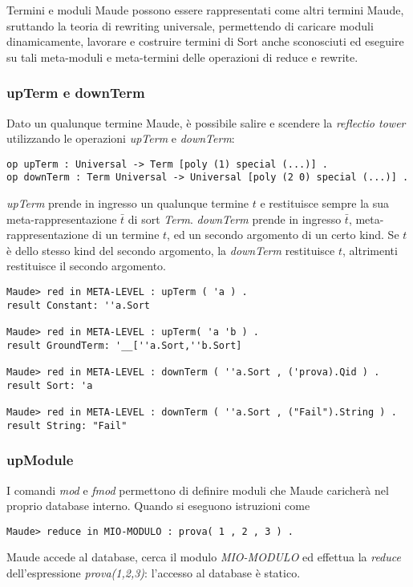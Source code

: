 Termini e moduli Maude possono essere rappresentati come altri termini Maude,
sruttando la teoria di rewriting universale, permettendo di caricare moduli
dinamicamente, lavorare e costruire termini di Sort anche sconosciuti ed
eseguire su tali meta-moduli e meta-termini delle operazioni di reduce e rewrite.

\subsubsection{upTerm e downTerm}

Dato un qualunque termine Maude, è possibile salire e scendere la
\emph{reflectio tower} utilizzando le operazioni \emph{upTerm} e
\emph{downTerm}:
\begin{Verbatim}[fontsize=\small]
op upTerm : Universal -> Term [poly (1) special (...)] .
op downTerm : Term Universal -> Universal [poly (2 0) special (...)] .
\end{Verbatim}
\emph{upTerm} prende in ingresso un qualunque termine $t$ e restituisce sempre
la sua meta-rappresentazione $\bar{t}$ di sort \emph{Term}. \emph{downTerm}
prende in ingresso $\bar{t}$, meta-rappresentazione di un termine $t$, ed un secondo argomento di
un certo kind. Se $t$ è dello stesso kind del secondo argomento, la
\emph{downTerm} restituisce $t$, altrimenti restituisce il secondo argomento.
\begin{Verbatim}[fontsize=\small]
Maude> red in META-LEVEL : upTerm ( 'a ) .
result Constant: ''a.Sort

Maude> red in META-LEVEL : upTerm( 'a 'b ) .
result GroundTerm: '__[''a.Sort,''b.Sort]

Maude> red in META-LEVEL : downTerm ( ''a.Sort , ('prova).Qid ) .
result Sort: 'a

Maude> red in META-LEVEL : downTerm ( ''a.Sort , ("Fail").String ) .
result String: "Fail"
\end{Verbatim}

\subsubsection{upModule}
\label{sec:upMod}
I comandi \emph{mod} e \emph{fmod} permettono di definire moduli che Maude
caricherà nel proprio database interno. Quando si eseguono istruzioni come
\begin{Verbatim}[fontsize=\small]
Maude> reduce in MIO-MODULO : prova( 1 , 2 , 3 ) .
\end{Verbatim}
Maude accede al database, cerca il modulo \emph{MIO-MODULO} ed effettua la
\emph{reduce} dell'espressione \emph{prova(1,2,3)}: l'accesso al database è
statico.

